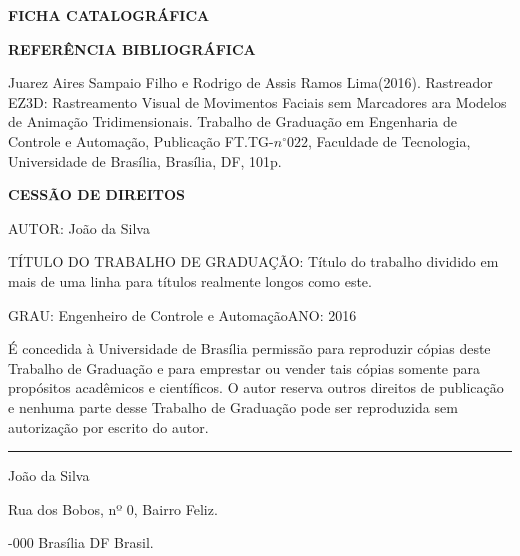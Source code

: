 \noindent \textbf{FICHA CATALOGRÁFICA}

\noindent %

\noindent \medskip{}


\noindent \textbf{REFERÊNCIA BIBLIOGRÁFICA}

Juarez Aires Sampaio Filho e Rodrigo de Assis Ramos Lima(2016). Rastreador EZ3D: Rastreamento Visual de Movimentos Faciais sem Marcadores ara Modelos de Animação Tridimensionais. Trabalho de Graduação
em Engenharia de Controle e Automação, Publicação FT.TG-$n^{\circ}022$,
Faculdade de Tecnologia, Universidade de Brasília, Brasília, DF, 101p.

\noindent \bigskip{}


\noindent \textbf{CESSÃO DE DIREITOS}

\noindent AUTOR: João da Silva

TÍTULO DO TRABALHO DE GRADUAÇÃO: Título do trabalho dividido em mais
de uma linha para títulos realmente longos como este.

\noindent \medskip{}


\noindent GRAU: Engenheiro de Controle e Automação\hfill{}ANO: 2016\hfill{}

\noindent \medskip{}


É concedida à Universidade de Brasília permissão para reproduzir cópias
deste Trabalho de Graduação e para emprestar ou vender tais cópias
somente para propósitos acadêmicos e científicos. O autor reserva
outros direitos de publicação e nenhuma parte desse Trabalho de Graduação
pode ser reproduzida sem autorização por escrito do autor.

\noindent \bigskip{}


\noindent \rule[0.5ex]{1\columnwidth}{1pt}

\noindent João da Silva

\noindent Rua dos Bobos, nº 0, Bairro Feliz.

-000 Brasília \textendash{} DF \textendash{} Brasil.
